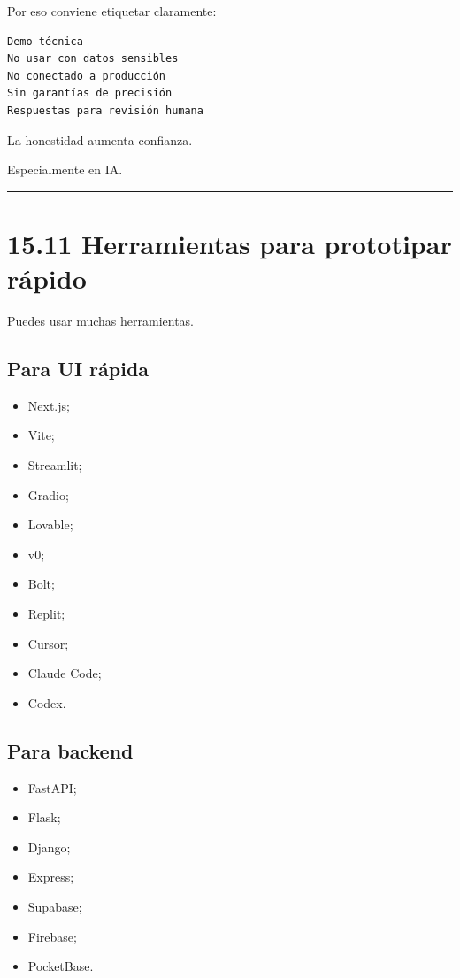 Por eso conviene etiquetar claramente:

\begin{lstlisting}
Demo técnica
No usar con datos sensibles
No conectado a producción
Sin garantías de precisión
Respuestas para revisión humana
\end{lstlisting}

La honestidad aumenta confianza.

Especialmente en IA.

\begin{center}\rule{0.5\linewidth}{0.5pt}\end{center}

\section{15.11 Herramientas para prototipar
rápido}\label{herramientas-para-prototipar-ruxe1pido}

Puedes usar muchas herramientas.

\subsection{Para UI rápida}\label{para-ui-ruxe1pida}

\begin{itemize}
\tightlist
\item
  Next.js;
\item
  Vite;
\item
  Streamlit;
\item
  Gradio;
\item
  Lovable;
\item
  v0;
\item
  Bolt;
\item
  Replit;
\item
  Cursor;
\item
  Claude Code;
\item
  Codex.
\end{itemize}

\subsection{Para backend}\label{para-backend}

\begin{itemize}
\tightlist
\item
  FastAPI;
\item
  Flask;
\item
  Django;
\item
  Express;
\item
  Supabase;
\item
  Firebase;
\item
  PocketBase.
\end{itemize}

